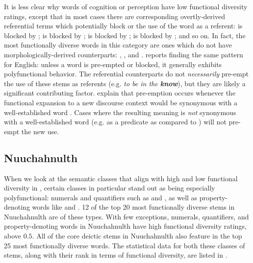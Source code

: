 It is less clear why words of cognition or perception have low functional diversity ratings, except that in most cases there are corresponding overtly-derived referential terms which potentially block or  \parencite[798]{ClarkClark1979} the use of the word as a referent:  is blocked by ;  is blocked by ;  is blocked by ;  is blocked by ; and so on. In fact, the most functionally diverse words in this category are ones which do not have morphologically-derived counterparts: , , and . \textcite[111]{Farrell2001} reports finding the same pattern for English: unless a word is pre-empted or blocked, it generally exhibits polyfunctional behavior. The referential counterparts do not \emph{necessarily} pre-empt the use of these stems as referents (e.g. \textit{to be in the \textbf{know}}), but they are likely a significant contributing factor. \textcite[798]{ClarkClark1979} explain that pre-emption occurs whenever the functional expansion to a new discourse context would be synonymous with a well-established word . Cases where the resulting meaning is \emph{not} synonymous with a well-established word (e.g.  as a predicate as compared to ) will not pre-empt the new use.

\subsection{Nuuchahnulth}
\label{sec:4.6.3}

When we look at the semantic classes that align with high and low functional diversity in , certain classes in particular stand out as being especially polyfunctional: numerals and quantifiers such as  and , as well as property-denoting words like  and . 12 of the top 20 most functionally diverse stems in Nuuchahnulth are of these types. With few exceptions, numerals, quantifiers, and property-denoting words in Nuuchahnulth have high functional diversity ratings, above $0.5$. All of the core deictic stems in Nuuchahnulth also feature in the top 25 most functionally diverse words. The statistical data for both these classes of stems, along with their rank in terms of functional diversity, are listed in .

